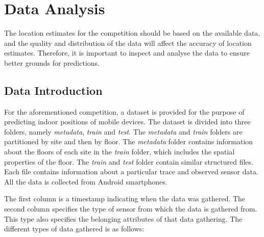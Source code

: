 \section{Data Analysis}\label{sec:data}
The location estimates for the competition should be based on the available data, and the quality and distribution of the data will affect the accuracy of location estimates. Therefore, it is important to inspect and analyse the data to ensure better grounds for predictions.

\subsection{Data Introduction} \label{sec:dataset} 
For the aforementioned competition, a dataset is provided for the purpose of predicting indoor positions of mobile devices. The dataset is divided into three folders, namely \textit{metadata}, \textit{train} and \textit{test}. The \textit{metadata} and \textit{train} folders are partitioned by site and then by floor. The \textit{metadata} folder contains information about the floors of each site in the \textit{train} folder, which includes the spatial properties of the floor. The \textit{train} and \textit{test} folder contain similar structured files. Each file contains information about a particular trace and observed sensor data. All the data is collected from Android smartphones.\cite{KaggleData}

The first column is a timestamp indicating when the data was gathered. The second column specifies the type of sensor from which the data is gathered from. This type also specifies the belonging attributes of that data gathering. The different types of data gathered is as follows\cite{KaggleDataGithub}:

